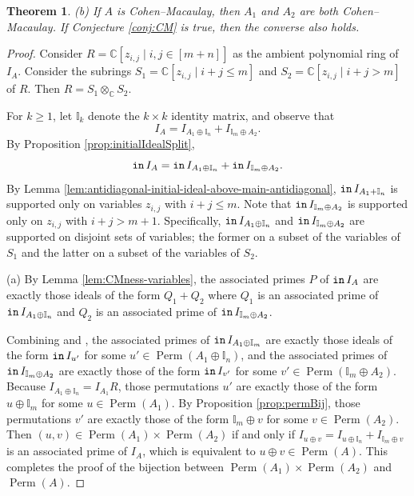 \documentclass[12 pt]{amsart}
\DeclareMathOperator{\init}{{\tt in}}
\DeclareMathOperator{\Perm}{Perm}
\theoremstyle{plain}
\newtheorem{thm}{Theorem}[section]
\theoremstyle{definition}
\theoremstyle{remark}
\begin{document}
{\begin{thm}
   (b) If $A$ is Cohen--Macaulay, then $A_1$ and $A_2$ are both Cohen--Macaulay.  If Conjecture \ref{conj:CM} is true, then the converse also holds.
\end{thm}
\begin{proof}
Consider $R = \mathbb{C}[z_{i,j} \mid i, j \in [m+n]]$ as the ambient polynomial ring of $I_A$.  Consider the subrings $S_1 = \mathbb{C}[z_{i,j} \mid i+j \leq m]$ and $S_2 = \mathbb{C}[z_{i,j} \mid i+j > m]$ of $R$.  Then $R = S_1 \otimes_\mathbb{C} S_2$.

    For $k \geq 1$, let $\mathbb{I}_k$ denote the $k \times k$ identity matrix, and observe that \[
    I_A = I_{A_1 \oplus \mathbb{I}_n}+I_{\mathbb{I}_m \oplus A_2}.
    \]  By Proposition \ref{prop:initialIdealSplit}, \[
\init I_A = \init I_{A_1 \oplus \mathbb{I}_n}+ \init I_{\mathbb{I}_m \oplus A_2}.
    \] By Lemma \ref{lem:antidiagonal-initial-ideal-above-main-antidiagonal}, $\init I_{A_1+\mathbb{I}_n}$ is supported only on variables $z_{i,j}$ with $i+j\leq m$.  Note that $\init I_{\mathbb{I}_m \oplus A_2}$ is supported only on $z_{i,j}$ with $i+j>m+1$.  Specifically, $\init I_{A_1 \oplus \mathbb{I}_n}$ and $\init I_{\mathbb{I}_m \oplus A_2}$ are supported on disjoint sets of variables; the former on a subset of the variables of $S_1$ and the latter on a subset of the variables of $S_2$.  

     (a) By Lemma \ref{lem:CMness-variables}, the associated primes $P$ of $\init I_A$ are exactly those ideals of the form $Q_1+Q_2$ where $Q_1$ is an associated prime of $\init I_{A_1 \oplus \mathbb{I}_n}$ and $Q_2$ is an associated prime of $\init I_{\mathbb{I}_m \oplus A_2}$.  
    
    Combining  and , the associated primes of $\init I_{A_1 \oplus \mathbb{I}_m}$ are exactly those ideals of the form $\init I_{u'}$ for some $u' \in \Perm(A_1 \oplus \mathbb{I}_n)$, and the associated primes of $\init I_{\mathbb{I}_m \oplus A_2}$ are exactly those of the form $\init I_{v'}$ for some $v' \in \Perm(\mathbb{I}_m \oplus A_2)$.  Because $I_{A_1 \oplus \mathbb{I}_n} = I_{A_1}R$, those permutations $u'$ are exactly those of the form $u \oplus \mathbb{I}_m$ for some $u \in \Perm(A_1)$.  By Proposition \ref{prop:permBij}, those permutations $v'$ are exactly those of the form $\mathbb{I}_m \oplus v$ for some $v \in \Perm(A_2)$. Then $(u,v) \in \Perm(A_1) \times \Perm(A_2)$ if and only if $I_{u \oplus v} = I_{u \oplus \mathbb{I}_n}+I_{\mathbb{I}_m \oplus v}$ is an associated prime of $I_A$, which is equivalent to $u \oplus v \in \Perm(A)$. This completes the proof of the bijection between $\Perm(A_1) \times \Perm(A_2)$ and $\Perm(A)$. 


\end{proof}}
\end{document}
